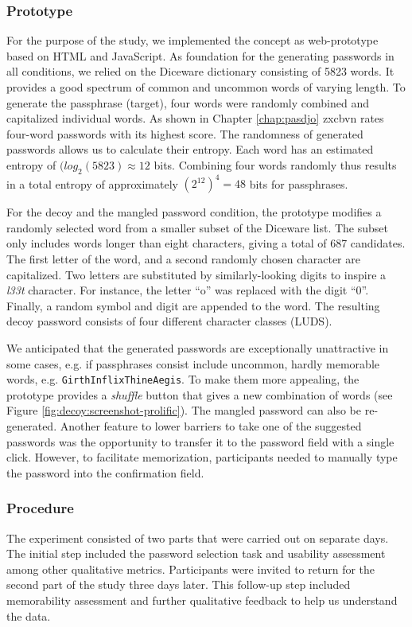 \subsubsection{Prototype}
For the purpose of the study, we implemented the concept as web-prototype based on HTML and JavaScript. As foundation for the generating passwords in all conditions, we relied on the Diceware dictionary consisting of 5823 words. It provides a good spectrum of common and uncommon words of varying length. To generate the passphrase (target), four words were randomly combined and capitalized individual words. As shown in Chapter \ref{chap:pasdjo} zxcbvn rates four-word passwords with its highest score. The randomness of generated passwords allows us to calculate their entropy. Each word has an estimated entropy of $(log_2(5823) \approx 12$ bits. Combining four words randomly thus results in a total entropy of approximately $ (2^{12})^4 = 48$ bits for passphrases.

For the decoy and the mangled password condition, the prototype modifies a randomly selected word from a smaller subset of the Diceware list. The subset only includes words longer than eight characters, giving a total of 687 candidates. The first letter of the word, and a second randomly chosen character are capitalized. Two letters are substituted by similarly-looking digits to inspire a \textit{l33t} character. For instance, the letter ``o'' was replaced with the digit ``0''. Finally, a random symbol and digit are appended to the word. The resulting decoy password consists of four different character classes (LUDS). 

We anticipated that the generated passwords are exceptionally unattractive in some cases, e.g. if passphrases consist include uncommon, hardly memorable words, e.g. \texttt{GirthInflixThineAegis}. To make them more appealing, the prototype provides a \textit{shuffle} button that gives a new combination of words (see Figure \ref{fig:decoy:screenshot-prolific}). The mangled password can also be re-generated. Another feature to lower barriers to take one of the suggested passwords was the opportunity to transfer it to the password field with a single click. However, to facilitate memorization, participants needed to manually type the password into the confirmation field. 

\subsubsection{Procedure}
The experiment consisted of two parts that were carried out on separate days. The initial step included the password selection task and usability assessment among other qualitative metrics. Participants were invited to return for the second part of the study three days later. This follow-up step included memorability assessment and further qualitative feedback to help us understand the data.

